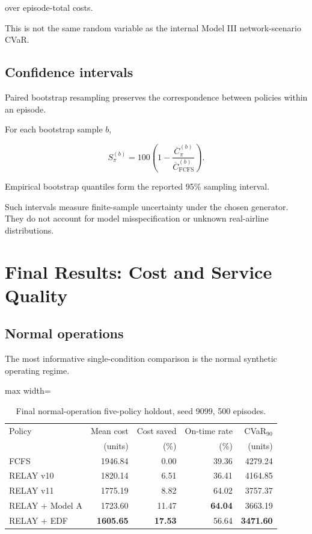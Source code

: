 \documentclass[10pt,a4paper]{article}
\theoremstyle{plain}
\theoremstyle{definition}
\theoremstyle{remark}
\begin{document}
over episode-total costs.

This is not the same random variable
as the internal Model III
network-scenario CVaR.

\subsection{Confidence intervals}

Paired bootstrap resampling
preserves the correspondence
between policies within an episode.

For each bootstrap sample \(b\),

\[
S_\pi^{(b)}
=
100
\left(
1-
\frac{
\overline C_\pi^{(b)}
}{
\overline C_{\mathrm{FCFS}}^{(b)}
}
\right).
\]

Empirical bootstrap quantiles
form the reported 95\%
sampling interval.

Such intervals measure finite-sample
uncertainty under the chosen generator.
They do not account for
model misspecification or
unknown real-airline distributions.

\section{Final Results: Cost and Service Quality}

\subsection{Normal operations}

The most informative
single-condition comparison is
the normal synthetic operating regime.

\begin{table}[!htbp]
\centering
\caption{
Final normal-operation five-policy
holdout, seed 9099, 500 episodes.
}
\label{tab:normal}
\small
\begin{adjustbox}{max width=\linewidth}
\begin{tabular}{@{}lrrrr@{}}
\toprule
Policy &
Mean cost &
Cost saved &
On-time rate &
CVaR$_{90}$ \\
&
(units) &
(\%) &
(\%) &
(units) \\
\midrule
FCFS &
1946.84 & 0.00 & 39.36 & 4279.24 \\
RELAY v10 &
1820.14 & 6.51 & 36.41 & 4164.85 \\
RELAY v11 &
1775.19 & 8.82 & 64.02 & 3757.37 \\
RELAY + Model A &
1723.60 & 11.47 & \textbf{64.04} & 3663.19 \\
RELAY + EDF &
\textbf{1605.65} &
\textbf{17.53} &
56.64 &
\textbf{3471.60} \\
\bottomrule
\end{tabular}
\end{adjustbox}
\end{table}
\end{document}
